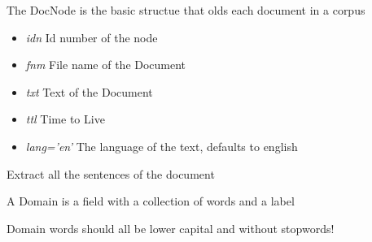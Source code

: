 \documentclass[letterpaper,10pt,english]{sphinxmanual}
\begin{document}
\begin{fulllineitems}
\label{theseus:theseus.DocNode}
The DocNode is the basic structue that olds each document in a corpus
\begin{itemize}
\item {} 
\emph{idn} Id number of the node

\item {} 
\emph{fnm} File name of the Document

\item {} 
\emph{txt} Text of the Document

\item {} 
\emph{ttl} Time to Live

\item {} 
\emph{lang='en'} The language of the text, defaults to english

\end{itemize}

\begin{fulllineitems}
\label{theseus:theseus.DocNode.extractSentences}
Extract all the sentences of the document

\end{fulllineitems}


\end{fulllineitems}


\begin{fulllineitems}
\label{theseus:theseus.Domain}
A Domain is a field with a collection of words and a label

Domain words should all be lower capital and without stopwords!

\end{fulllineitems}

\end{document}
